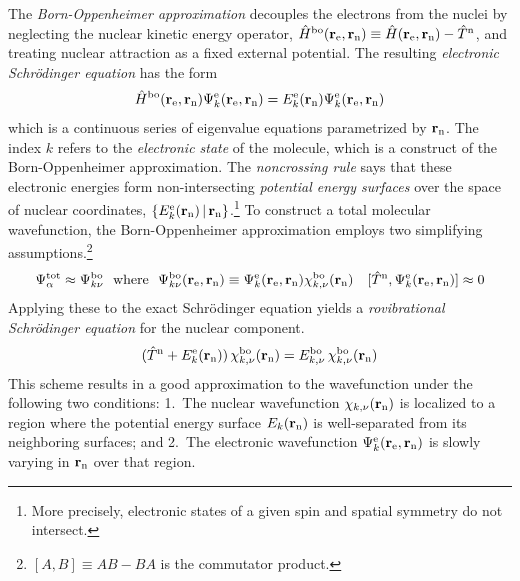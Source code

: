 \documentclass[11pt]{article}
\begin{document}
\begin{dfn}
The \textit{Born-Oppenheimer approximation} decouples the electrons from the nuclei by neglecting the nuclear kinetic energy operator,
$
  \hat{H}^{\mathrm{bo}}(\mathbf{r}_{\mathrm{e}},\mathbf{r}_{\mathrm{n}})
\equiv
  \hat{H}(\mathbf{r}_{\mathrm{e}},\mathbf{r}_{\mathrm{n}})
-
  \hat{T}^{\mathrm{n}}
$,
and treating nuclear attraction as a fixed external potential.
The resulting \textit{electronic Schr\"odinger equation} has the form
\begin{align}
\label{eq:born-oppenheimer-equation}
  \hat{H}^{\mathrm{bo}}(\mathbf{r}_{\mathrm{e}},\mathbf{r}_{\mathrm{n}})
  \Psi _k^{\mathrm{e}}(\mathbf{r}_{\mathrm{e}},\mathbf{r}_{\mathrm{n}})
=
  E_k^{\mathrm{e}}(\mathbf{r}_{\mathrm{n}})
  \Psi _k^{\mathrm{e}}(\mathbf{r}_{\mathrm{e}},\mathbf{r}_{\mathrm{n}})
\end{align}
which is a continuous series of eigenvalue equations parametrized by $\mathbf{r}_{\mathrm{n}}$.
The index $k$ refers to the \textit{electronic state} of the molecule, which is a construct of the Born-Oppenheimer approximation.
The \textit{noncrossing rule} says that these electronic energies form non-intersecting \textit{potential energy surfaces} over the space of nuclear coordinates, $\{E_k^{\mathrm{e}}(\mathbf{r}_{\mathrm{n}})\,|\,\mathbf{r}_{\mathrm{n}}\}$.\footnote{
  More precisely, electronic states of a given spin and spatial symmetry do not intersect.
}
To construct a total molecular wavefunction, the Born-Oppenheimer approximation employs two simplifying assumptions.\footnote{
  $[A, B]\equiv AB - BA$ is the commutator product.
}
\begin{align}
\label{eq:born-oppenheimer-approximations}
  \Y_\a^\mr{tot}
\approx
  \Y_{k\nu}^\mr{bo}
\ \ \text{where} \ \ 
  \Y_{k\nu}^\mr{bo}(\bo{r}_\mr{e},\bo{r}_\mr{n})
\equiv
  \Y_k^\mr{e}(\bo{r}_\mr{e},\bo{r}_\mr{n})
  \x_{k,\nu}^\mr{bo}(\bo{r}_\mr{n})
&&
  [\op{T}^\mr{n}, \Y_k^\mr{e}(\bo{r}_\mr{e},\bo{r}_\mr{n})]
\approx
  0
\end{align}
Applying these to the exact Schr\"odinger equation yields a \textit{rovibrational Schr\"odinger equation} for the nuclear component.
\begin{align}
\label{eq:born-oppeheimer-nuclear-motion-equation}
  (
    \op{T}^\mr{n}
  +
    E_k^\mr{e}(\bo{r}_\mr{n})
  )\,
  \x_{k,\nu}^\mr{bo}(\bo{r}_\mr{n})
=
  E_{k,\nu}^\mr{bo}\,
  \x_{k,\nu}^\mr{bo}(\bo{r}_\mr{n})
\end{align}
This scheme results in a good approximation to the wavefunction under the following two conditions:
1.~The nuclear wavefunction $\x_{k,\nu}(\bo{r}_\mr{n})$ is localized to a region where the potential energy surface $E_k(\mathbf{r}_{\mathrm{n}})$ is well-separated from its neighboring surfaces;
and 2.~The electronic wavefunction $\Psi _k^{\mathrm{e}}(\mathbf{r}_{\mathrm{e}},\mathbf{r}_{\mathrm{n}})$ is slowly varying in $\mathbf{r}_{\mathrm{n}}$ over that region.
\end{dfn}
\end{document}

